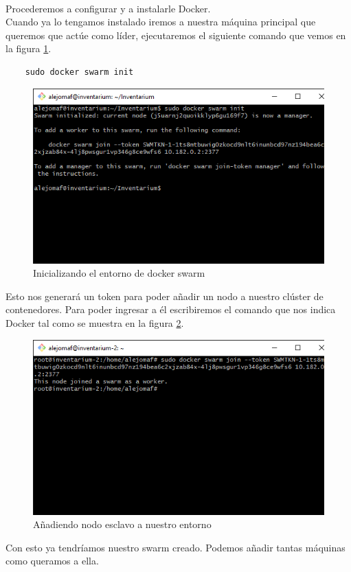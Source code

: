 \\Procederemos a configurar y a instalarle Docker.
\\Cuando ya lo tengamos instalado iremos a nuestra máquina principal que queremos que actúe como líder, ejecutaremos el siguiente comando que vemos en la figura \ref{fig:docker-swarm-init}.
\begin{verbatim}
    sudo docker swarm init
\end{verbatim}
\begin{figure}
    \centering
    \includegraphics[scale=0.5, keepaspectratio]{imagenes/complemento/docker-swarm/docker-swarm-init.png}
    \caption{Inicializando el entorno de docker swarm}\label{fig:docker-swarm-init}
\end{figure}
Esto nos generará un token para poder añadir un nodo a nuestro clúster de contenedores. Para poder ingresar a él escribiremos el comando que nos indica Docker tal como se muestra en la figura \ref{fig:docker-compose-join}.
\begin{figure}
    \centering
    \includegraphics[scale=0.5, keepaspectratio]{imagenes/complemento/docker-swarm/docker-compose-join.png}
    \caption{Añadiendo nodo esclavo a nuestro entorno}\label{fig:docker-compose-join}
\end{figure}
Con esto ya tendríamos nuestro swarm creado. Podemos añadir tantas máquinas como queramos a ella.

